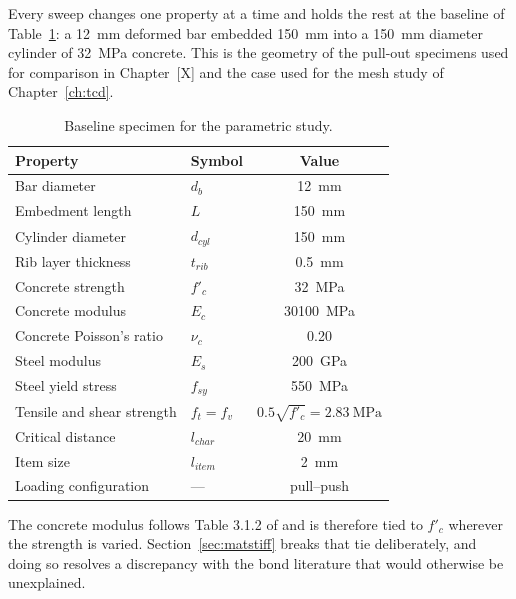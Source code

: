Every sweep changes one property at a time and holds the rest at the
baseline of Table~\ref{tab:factorbase}: a \SI{12}{\milli\metre} deformed bar
embedded \SI{150}{\milli\metre} into a \SI{150}{\milli\metre} diameter
cylinder of \SI{32}{\mega\pascal} concrete. This is the geometry of the
pull-out specimens used for comparison in Chapter~[X] and the case used for
the mesh study of Chapter~\ref{ch:tcd}.

\begin{table}[H]
\centering
\caption{Baseline specimen for the parametric study.}
\label{tab:factorbase}
\small
\begin{tabular*}{\linewidth}{@{\extracolsep{\fill}}llc@{}}
\hline
Property & Symbol & Value \\
\hline
Bar diameter                  & $d_b$          & \SI{12}{\milli\metre} \\
Embedment length              & $L$            & \SI{150}{\milli\metre} \\
Cylinder diameter             & $d_{cyl}$      & \SI{150}{\milli\metre} \\
Rib layer thickness           & $t_{rib}$      & \SI{0.5}{\milli\metre} \\
Concrete strength             & $f'_c$         & \SI{32}{\mega\pascal} \\
Concrete modulus              & $E_c$          & \SI{30100}{\mega\pascal} \\
Concrete Poisson's ratio      & $\nu_c$        & 0.20 \\
Steel modulus                 & $E_s$          & \SI{200}{\giga\pascal} \\
Steel yield stress            & $f_{sy}$       & \SI{550}{\mega\pascal} \\
Tensile and shear strength    & $f_t=f_v$      & $0.5\sqrt{f'_c}=\SI{2.83}{\mega\pascal}$ \\
Critical distance             & $l_{char}$     & \SI{20}{\milli\metre} \\
Item size                     & $l_{item}$     & \SI{2}{\milli\metre} \\
Loading configuration         & ---            & pull--push \\
\hline
\end{tabular*}
\end{table}

The concrete modulus follows Table 3.1.2 of
\textcite{as3600ConcreteStructures2018} and is therefore tied to $f'_c$
wherever the strength is varied. Section~\ref{sec:matstiff} breaks that tie
deliberately, and doing so resolves a discrepancy with the bond literature
that would otherwise be unexplained.

